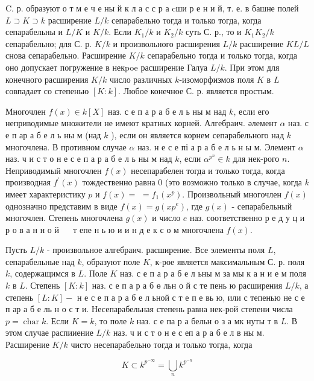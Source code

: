 \documentclass[10pt]{article}
\begin{document}
C. р. образуют о т м е ч е ны й к л а с с р а cши р е н и й, т. е. в башне полей $L \supset K \supset k$ расширение $L / k$ сепарабельно тогда и только тогда, когда сепарабельны и $L / K$ и $K / k$. Если $K_{1} / k$ и $K_{2} / k$ суть С. р., то и $K_{1} K_{2} / k$ сепарабельно; для С. р. $K / k$ и произвольного расширения $L / k$ расширение $K L / L$ снова сепарабельно. Расширение $K / k$ сепарабельно тогда и только тогда, когда оно допускает погружение в некpoe расширение Галуа $L / k$. При этом для конечного расширения $K / k$ число различных $k$-изоморфизмов поля $K$ в $L$ совпадает со степенью $[K: k]$. Любое конечное С. р. является простым.



Многочлен $f(x) \in k[X]$ наз. с е п а р а б е л ь ны м над $k$, если его неприводимые множители не имеют кратных корней. Алгебраич. әлемент $\alpha$ наз. с е п ар а б е л ь ны м (над $k$ ), если он является корнем сепарабельного над $k$ многочлена. В противном случае $\alpha$ наз. н е с е пі а р а б е л ь н ы м. Элемент $\alpha$ наз. ч и с т о н е с е п а р а б е л ь ны м над $k$, если $\alpha^{p^{n}} \in k$ для нек-рого $n$. Неприводимый многочлен $f(x)$ несепарабелен тогда и только тогда, когда производная $f^{\prime}(x)$ тождественно равна 0 (это возможно только в случае, когда $k$ имеет характеристику $p$ и $f(x)=$ $=f_{1}\left(x^{p}\right)$. Произвольный многочлен $f(x)$ однозначно представим в виде $f(x)=g\left(x p^{e}\right)$, где $g(x)$ - сепарабельный многочлен. Степень многочлена $g(x)$ и число $e$ наз. соответственно р е д у ц и р о в а н н о й $\quad$ т епе н ь ю и и н д е к с о м многочлена $f(x)$.



Пусть $L / k$ - произвольное алгебраич. расширение. Все элементы поля $L$, сепарабельные над $k$, образуют поле $K$, к-рое является максимальным С. р. поля $k$, содержащимся в $L$. Поле $K$ наз. с е п а р а б е л ьны м за мы к а н и е м поля $k$ в $L$. Степень $[K: k]$ наз. с е п а р а б ө льн о й с те пень ю расширения $L / k$, а степень $[L: K]-$ н е с е п а р а б е л ьной с т е п е вь ю, или с тепенью не с е п ар а б е ль н о с т и. Несепарабельная степень равна нек-рой степени числа $p=\operatorname{char} k$. Если $K=k$, то поле $k$ наз. с е па р а бельн о з а мк нуты т в $L$. В этом случае распииение $L / k$ наз. ч и с т о н е с еп а р а б е л в ны м. Расширение $K / k$ чисто несепарабельно тогда и только тогда, когда



\[

K \subset k^{p^{-\infty}}=\bigcup_{n} k^{p^{-n}}

\]
\end{document}
